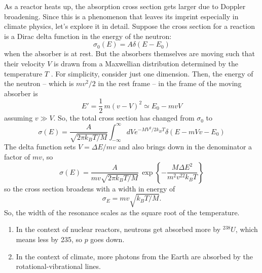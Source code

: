 \documentclass[11pt]{book}
\def\be{\begin{equation}}
\def\ee{\end{equation}}
\newcommand\bei{\begin{itemize}}
\newcommand\eei{\end{itemize}}
\newcommand\bee{\begin{enumerate}}
\newcommand\eee{\end{enumerate}}
\begin{document}
As a reactor heats up, the absorption cross section gets larger due to Doppler broadening. Since this is a phenomenon that leaves its imprint especially in climate physics, let's explore it in detail. Suppose the cross section for a reaction is a Dirac delta function in the energy of the neutron:
\be
\sigma_0(E) = A\delta(E-E_0)
\ee
when the absorber is at rest. But the absorbers themselves are moving such that their velocity $V$ is drawn from a Maxwellian distribution determined by the temperature $T$ . For simplicity, consider just one dimension. Then, the energy of the neutron -- which is $mv^2/2$ in the rest frame -- in the frame of the moving absorber is 
\be
E'=\frac12\,m(v-V)^2 \simeq E_0 - mvV
\ee
assuming $v\gg V$. So, the total cross section has changed from
$\sigma_0 $
to
\be
\sigma(E) = \frac{A}{\sqrt{2\pi k_BT/M}} \int_{-\infty}^\infty dV e^{-MV^2/2k_BT} \delta(E-mVv-E_0)
\ee
The delta function sets $V=\Delta E/mv$ and also brings down in the denominator a factor of $mv$, so
\be
\sigma(E)= \frac{A}{mv\sqrt{2\pi k_BT/M}} \,\exp\left\{ -\frac{M\Delta E^2}{m^2v^22k_BT} \right\}
\ee
so the cross section broadens with a width in energy of \be
\sigma_E = mv \sqrt{k_BT/M}.\ee
So, the width of the resonance scales as the square root of the temperature.

\bee
\item
In the context of nuclear reactors, neutrons get absorbed more by $^{238}U$, which means less by 235, so $p$ goes down.
\item In the context of climate, more photons from the Earth are absorbed by the rotational-vibrational lines.
\eee

%
%
\end{document}
